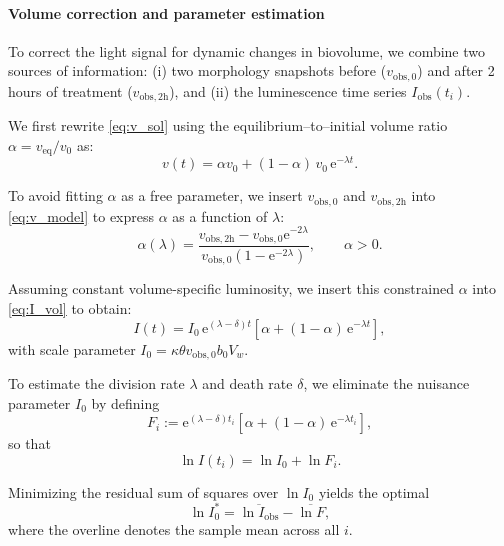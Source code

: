 \paragraph{Volume correction and parameter estimation}

To correct the light signal for dynamic changes in biovolume, we combine two sources of information:
(i) two morphology snapshots before ($v_{\mathrm{obs},0}$) and after 2 hours of treatment ($v_{\mathrm{obs},2\mathrm h}$), and
(ii) the luminescence time series $I_{\mathrm{obs}}(t_i)$.

We first rewrite \autoref{eq:v_sol} using the equilibrium–to–initial volume ratio $\alpha = v_{\mathrm{eq}} / v_{0}$ as:
\begin{equation}
  \label{eq:v_model}
  v(t) = \alpha v_{0} + (1 - \alpha)\, v_{0}\, \mathrm{e}^{-\lambda t}.
\end{equation}

To avoid fitting $\alpha$ as a free parameter, we insert $v_{\mathrm{obs},0}$ and $v_{\mathrm{obs},2\mathrm h}$ into \autoref{eq:v_model} to express $\alpha$ as a function of $\lambda$:
\begin{equation}
  \label{eq:alpha_constraint}
  \alpha(\lambda) = \frac{v_{\mathrm{obs},2\mathrm h} - v_{\mathrm{obs},0} \mathrm{e}^{-2\lambda}}{v_{\mathrm{obs},0}(1 - \mathrm{e}^{-2\lambda})},
  \qquad \alpha > 0.
\end{equation}

Assuming constant volume-specific luminosity, we insert this constrained $\alpha$ into \autoref{eq:I_vol} to obtain:
\begin{equation}
  \label{eq:I_model}
  I(t) = I_0\, \mathrm{e}^{(\lambda - \delta)t} \left[ \alpha + (1 - \alpha)\, \mathrm{e}^{-\lambda t} \right],
\end{equation}
with scale parameter $I_0 = \kappa \theta v_{\mathrm{obs},0} b_0 V_w$.

To estimate the division rate $\lambda$ and death rate $\delta$, we eliminate the nuisance parameter $I_0$ by defining
\begin{equation}
  \label{eq:F_def}
  F_i := \mathrm{e}^{(\lambda - \delta)t_i} \left[ \alpha + (1 - \alpha)\, \mathrm{e}^{-\lambda t_i} \right],
\end{equation}
so that
\begin{equation}
  \label{eq:lnI}
  \ln I(t_i) = \ln I_0 + \ln F_i.
\end{equation}

Minimizing the residual sum of squares over $\ln I_0$ yields the optimal
\begin{equation}
  \label{eq:I_star}
  \ln I_0^\ast = \overline{\ln I_{\mathrm{obs}}} - \overline{\ln F},
\end{equation}
where the overline denotes the sample mean across all $i$.

